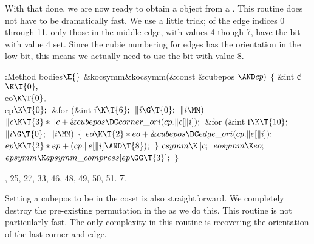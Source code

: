 With that done, we are now ready to obtain a  object from
a
.  This routine does not have to be dramatically fast.  We
use a little trick; of the edge indices 0 through 11, only those in the
middle edge, with values 4 though 7, have the bit with value 4 set.
Since the cubie numbering for edges has the orientation in the low bit,
this means we actually need to use the bit with value 8.

\Y\B\4:Method bodies\X${}\E{}$\6
\&{kocsymm}\DC\&{kocsymm}(\&{const} \&{cubepos} ${}{\AND}\\{cp}){}$\1\1\2\2\6
${}\{{}$\1\6
\&{int} \|c${}\K\T{0},{}$ \\{eo}${}\K\T{0},{}$ \\{ep}${}\K\T{0};{}$\7
\&{for} (\&{int} \|i${}\K\T{6};{}$ ${}\|i\G\T{0};{}$ ${}\|i\MM){}$\1\5
${}\|c\K\T{3}*\|c+\&{cubepos}\DC\\{corner\_ori}(\\{cp}.\|c[\|i]);{}$\2\6
\&{for} (\&{int} \|i${}\K\T{10};{}$ ${}\|i\G\T{0};{}$ ${}\|i\MM){}$\5
${}\{{}$\1\6
${}\\{eo}\K\T{2}*\\{eo}+\&{cubepos}\DC\\{edge\_ori}(\\{cp}.\|e[\|i]);{}$\6
${}\\{ep}\K\T{2}*\\{ep}+(\\{cp}.\|e[\|i]\AND\T{8});{}$\6
\4${}\}{}$\2\6
${}\\{csymm}\K\|c;{}$\6
${}\\{eosymm}\K\\{eo};{}$\6
${}\\{epsymm}\K\\{epsymm\_compress}[\\{ep}\GG\T{3}];{}$\6
\4${}\}{}$\2\par
{}, 25, 27, 33, 46, 48, 49, 50, 51.
\U7.\fi

Setting a cubepos to be in the coset is also straightforward.  We
completely destroy the pre-existing permutation in the  as
we do this.  This routine is not particularly fast.  The only
complexity in this routine is recovering the orientation of the
last corner and edge.

